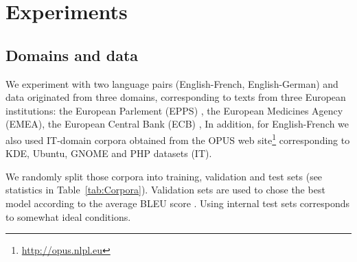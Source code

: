 \documentclass[a4paper]{article}
\DeclareMathOperator*{\argmin}{argmin}
\begin{document}


\section{Experiments \label{sec:experiments}}

\subsection{Domains and data \label{ssec:data}}

We experiment with two language pairs (English-French, English-German) and data originated from three domains, corresponding to texts from three European institutions: 
the European Parlement (EPPS) \cite{Koehn05europarl}, 
the European Medicines Agency (EMEA), 
the European Central Bank (ECB) \cite{Tiedemann09news},
In addition, for English-French we also used IT-domain corpora obtained from the OPUS web site\footnote{\url{http://opus.nlpl.eu}} corresponding to KDE, Ubuntu, GNOME and PHP datasets (IT).

We randomly split those corpora into training, validation and test sets (see statistics in Table~\ref{tab:Corpora}).
Validation sets are used to chose the best model according to the average BLEU score \cite{Papineni02bleu}.
Using internal test sets corresponds to somewhat ideal conditions.

\end{document}

